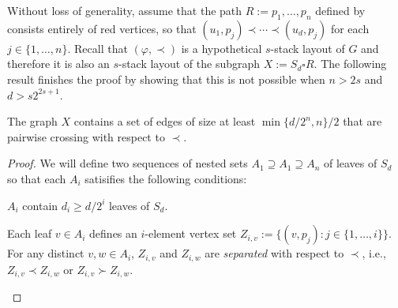 \documentclass[kpfonts]{patmorin}
\renewcommand{\ge}{\geqslant}
\begin{document}
Without loss of generality, assume that the path $R:=p_1,\ldots,p_n$ defined by  consists entirely of red vertices, so that $(u_1,p_j)\prec\cdots\prec (u_d,p_j)$ for each $j\in\{1,\ldots,n\}$.
Recall that $(\varphi,\prec)$ is a hypothetical $s$-stack layout of $G$ and therefore it is also an $s$-stack layout of the subgraph $X:=S_d\square R$.  The following result finishes the proof by showing that this is not possible when $n> 2s$ and $d> s2^{2s+1}$.

\begin{lem}
    The graph $X$ contains a set of edges of size at least $\min\{d/2^{n},n\}/2$ that are pairwise crossing with respect to $\prec$.
\end{lem}

\begin{proof}
    We will define two sequences of nested sets $A_1\supseteq A_1\supseteq A_{n}$ of leaves of $S_d$ so that each $A_i$ satisifies the following conditions:
    \begin{compactenum}[(C1)]
        \item $A_i$ contain $d_i\ge d/2^i$ leaves of $S_d$.
        \item Each leaf $v\in A_i$ defines an $i$-element vertex set $Z_{i,v}:=\{(v,p_j):j\in\{1,\ldots,i\}\}$.  For any distinct $v,w\in A_i$, $Z_{i,v}$ and $Z_{i,w}$ are \emph{separated} with respect to $\prec$, i.e., $Z_{i,v}\prec Z_{i,w}$ or $Z_{i,v}\succ Z_{i,w}$.
    \end{compactenum}


\end{proof}
\end{document}
